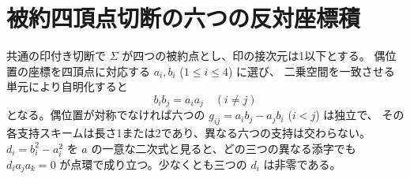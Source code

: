 \section{被約四頂点切断の六つの反対座標積}
\label{sec:finite-marked-tetrahedral-products}
\begin{theorem}\label{thm:finite-marked-tetrahedral-products}
共通の印付き切断で $\Sigma$ が四つの被約点とし、印の接次元は1以下とする。
偶位置の座標を四頂点に対応する $a_i,b_i$ ($1\le i\le4$) に選び、
二乗空間を一致させる単元により自明化すると
\[
                      b_i b_j=a_i a_j \quad(i\ne j)
\]
となる。偶位置が対称でなければ六つの $g_{ij}=a_i b_j-a_j b_i$ ($i<j$) は独立で、
その各支持スキームは長さ1または2であり、異なる六つの支持は交わらない。
$d_i=b_i^2-a_i^2$ を $a$ の一意な二次式と見ると、どの三つの異なる添字でも
$d_i a_j a_k=0$ が点環で成り立つ。少なくとも三つの $d_i$ は非零である。
\end{theorem}
